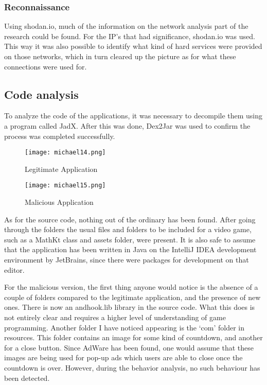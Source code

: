 {{{{\subsubsection{Reconnaissance}

Using shodan.io, much of the information on the network analysis part of the research could be found. For the IP’s that had significance, shodan.io was used. This way it was also possible to identify what kind of hard services were provided on those networks, which in turn cleared up the picture as for what these connections were used for.

\newpage
\subsection{Code analysis}
To analyze the code of the applications, it was necessary to decompile them using a program called JadX. After this was done, Dex2Jar was used to confirm the process was completed successfully.


\begin{figure}
\centering
\begin{minipage}{.5\textwidth}
  \centering
  \texttt{[image: michael14.png]}
  \caption{Legitimate Application}
  \label{fig:test1}
\end{minipage}%
\begin{minipage}{.5\textwidth}
  \centering
  \texttt{[image: michael15.png]}
  \caption{Malicious Application}
  \label{fig:test2}
\end{minipage}
\end{figure}

As for the source code, nothing out of the ordinary has been found. After going through the folders the usual files and folders to be included for a video game, such as a MathKt class and assets folder, were present. It is also safe to assume that the application has been written in Java on the IntelliJ IDEA development environment by JetBrains, since there were packages for development on that editor.

For the malicious version, the first thing anyone would notice is the absence of a couple of folders compared to the legitimate application, and the presence of new ones. There is now an andhook.lib library in the source code. What this does is not entirely clear and requires a higher level of understanding of game programming. Another folder I have noticed appearing is the ‘com’ folder in resources. This folder contains an image for some kind of countdown, and another for a close button. Since AdWare has been found, one would assume that these images are being used for pop-up ads which users are able to close once the countdown is over. However, during the behavior analysis, no such behaviour has been detected.

}}}}
